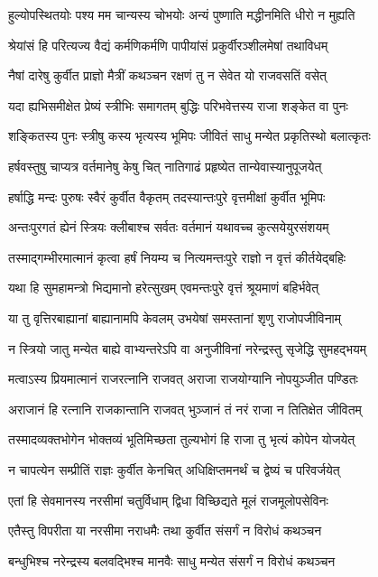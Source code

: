 \twolineshloka
{हुल्योपस्थितयोः पश्य मम चान्यस्य चोभयोः}
{अन्यं पुष्णाति मद्धीनमिति धीरो न मुह्यति}


\twolineshloka
{श्रेयांसं हि परित्यज्य वैद्यं कर्मणिकर्मणि}
{पापीयांसं प्रकुर्वीरञ्शीलमेषां तथाविधम्}


\twolineshloka
{नैषां दारेषु कुर्वीत प्राज्ञो मैत्रीं कथञ्चन}
{रक्षणं तु न सेवेत यो राजवसतिं वसेत्}


\twolineshloka
{यदा ह्यभिसमीक्षेत प्रेष्यं स्त्रीभिः समागतम्}
{बुद्धिः परिभवेत्तस्य राजा शङ्केत वा पुनः}


\twolineshloka
{शङ्कितस्य पुनः स्त्रीषु कस्य भृत्यस्य भूमिपः}
{जीवितं साधु मन्येत प्रकृतिस्थो बलात्कृतः}


\twolineshloka
{हर्षवस्तुषु चाप्यत्र वर्तमानेषु केषु चित्}
{नातिगाढं प्रहृष्येत तान्येवास्यानुपूजयेत्}


\twolineshloka
{हर्षाद्धि मन्दः पुरुषः स्वैरं कुर्वीत वैकृतम्}
{तदस्यान्तःपुरे वृत्तमीक्षां कुर्वीत भूमिपः}


\twolineshloka
{अन्तःपुरगतं ह्येनं स्त्रियः क्लीबाश्च सर्वतः}
{वर्तमानं यथावच्च कुत्सयेयुरसंशयम्}


\twolineshloka
{तस्माद्गम्भीरमात्मानं कृत्वा हर्षं नियम्य च}
{नित्यमन्तःपुरे राज्ञो न वृत्तं कीर्तयेद्बहिः}


\twolineshloka
{यथा हि सुमहामन्त्रो भिद्यमानो हरेत्सुखम्}
{एवमन्तःपुरे वृत्तं श्रूयमाणं बहिर्भवेत्}


\twolineshloka
{या तु वृत्तिरबाह्यानां बाह्यानामपि केवलम्}
{उभयेषां समस्तानां शृणु राजोपजीविनाम्}


\twolineshloka
{न स्त्रियो जातु मन्येत बाह्ये वाभ्यन्तरेऽपि वा}
{अनुजीविनां नरेन्द्रस्तु सृजेद्धि सुमहद्भयम्}


\twolineshloka
{मत्वाऽस्य प्रियमात्मानं राजरत्नानि राजवत्}
{अराजा राजयोग्यानि नोपयुञ्जीत पण्डितः}


\twolineshloka
{अराजानं हि रत्नानि राजकान्तानि राजवत्}
{भुञ्जानं तं नरं राजा न तितिक्षेत जीवितम्}


\twolineshloka
{तस्मादव्यक्तभोगेन भोक्तव्यं भूतिमिच्छता}
{तुल्यभोगं हि राजा तु भृत्यं कोपेन योजयेत्}


\twolineshloka
{न चापत्येन सम्प्रीतिं राज्ञः कुर्वीत केनचित्}
{अधिक्षिप्तमनर्थं च द्वेष्यं च परिवर्जयेत्}


\twolineshloka
{एतां हि सेवमानस्य नरसीमां चतुर्विधाम्}
{द्विधा विच्छिद्यते मूलं राजमूलोपसेविनः}


\twolineshloka
{एतैस्तु विपरीता या नरसीमा नराधमैः}
{तथा कुर्वीत संसर्गं न विरोधं कथञ्चन}


\twolineshloka
{बन्धुभिश्च नरेन्द्रस्य बलवद्भिश्च मानवैः}
{साधु मन्येत संसर्गं न विरोधं कथञ्चन}


